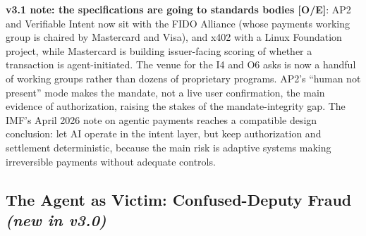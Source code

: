 \documentclass[11pt,letterpaper]{article}
\begin{document}
\textbf{v3.1 note: the specifications are going to standards bodies [O/E]}: AP2 and Verifiable Intent now sit with the FIDO Alliance (whose payments working group is chaired by Mastercard and Visa), and x402 with a Linux Foundation project, while Mastercard is building issuer-facing scoring of whether a transaction is agent-initiated. The venue for the I4 and O6 asks is now a handful of working groups rather than dozens of proprietary programs. AP2's ``human not present'' mode makes the mandate, not a live user confirmation, the main evidence of authorization, raising the stakes of the mandate-integrity gap. The IMF's April 2026 note on agentic payments reaches a compatible design conclusion: let AI operate in the intent layer, but keep authorization and settlement deterministic, because the main risk is adaptive systems making irreversible payments without adequate controls.

\subsection{The Agent as Victim: Confused-Deputy Fraud \textit{(new in v3.0)}}
\label{sec:victim}
\end{document}
